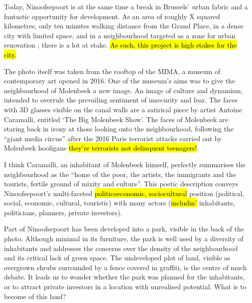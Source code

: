 \documentclass{article}[11pt]
\begin{document}
Today, Ninoofsepoort is at the same time a break in Brussels' urban fabric and a fantastic opportunity for development. As an area of roughly X squared kilometres, only ten minutes walking distance from the Grand Place, in a dense city with limited space, and in a neighbourhood targeted as a zone for urban renovation \parencite{perspective2020zru}, there is a lot at stake. \hl{As such, this project is high stakes for the city.}

The photo itself was taken from the rooftop of the MIMA, a museum of contemporary art opened in 2016. One of the museum's aims was to give the neighbourhood of Molenbeek a new image. An image of culture and dynamism, intended to overrule the prevailing sentiment of insecurity and fear. The faces with 3D glasses visible on the canal walls are a satirical piece by artist Antoine Caramalli, entitled `The Big Molenbeek Show'. The faces of Molenbeek are staring back in irony at those looking onto the neighbourhood, following the ``giant media circus''\parencite{antoine2016canal} after the 2016 Paris terrorist attacks carried out by Molenbeek hooligans \hl{they're terrorists not delinquent teenagers!}.

I think Caramalli, an inhabitant of Molenbeek himself, perfectly summarises the neighbourhood as the ``home of the poor, the artists, the immigrants and the tourists, fertile ground of mixity and culture''\parencite{antoine2016canal}.
This poetic description conveys Ninoofsepoort's multi-faceted \hl{politicoeconomic, sociocultural} position (political, social, economic, cultural, touristic) with many actors (\hl{includin'} inhabitants, politicians, planners, private investors).

Part of Ninoofsepoort has been developed into a park, visible in the back of the photo. Although minimal in its furniture, the park is well used by a diversity of inhabitants and addresses the concerns over the density of the neighbourhood and its critical lack of green space.
The undeveloped plot of land, visible as overgrown shrubs surrounded by a fence covered in graffiti, is the centre of much debate. It leads us to wonder whether the park was planned for the inhabitants, or to attract private investors in a location with unrealised potential. What is to become of this land?

\end{document}
